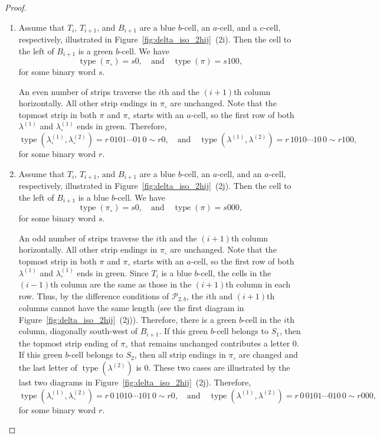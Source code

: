 \documentclass[11pt]{article}
\theoremstyle{definition}
\theoremstyle{remark}
\theoremstyle{definition}
\numberwithin{equation}{section}
\newcommand{\type}{\operatorname{type}}
\newcommand\qand{\quad\text{and}\quad}
\begin{document}
\begin{proof}
\begin{enumerate}[label=(2\alph*)]
\item Assume that \( T_i \), \( T_{i+1} \), and \( B_{i+1} \) are a
  blue \( b \)-cell, an \( a \)-cell, and a \( c \)-cell,
  respectively, illustrated in
  Figure~\ref{fig:delta_iso_2hij}~(2i). Then the cell to the left
  of \( B_{i+1} \) is a green \(b\)-cell. We have
  \[
    \type(\pi_\circ)=s0, \qand \type(\pi)=s100,
  \]
  for some binary word \(s\).

  An even number of strips traverse the \(i\)th and the \((i+1)\)th
  column horizontally. All other strip endings in \(\pi_\circ\) are
  unchanged. Note that the topmost strip in both \(\pi\) and
  \(\pi_\circ\) starts with an \(a\)-cell, so the first row of both
  \(\lambda^{(1)}\) and \(\lambda_\circ^{(1)}\) ends in green. Therefore,
  \[
    \type(\lambda_\circ^{(1)},\lambda_\circ^{(2)})=r\,0101\cdots01\,0\sim r0, \qand \type(\lambda^{(1)},\lambda^{(2)})=r\,1010\cdots10\,0\sim r100,
  \]
  for some binary word \(r\).


  \item Assume that \( T_i \), \( T_{i+1} \), and \( B_{i+1} \) are a
blue \( b \)-cell, an \( a \)-cell, and an \( a \)-cell, respectively,
  illustrated in Figure~\ref{fig:delta_iso_2hij}~(2j). Then the cell to the
  left of \( B_{i+1} \) is a blue \( b \)-cell. We have
  \[
    \type(\pi_\circ)=s0, \qand \type(\pi)=s000,
  \]
  for some binary word \(s\).

  An odd number of strips traverse the \(i\)th and the \((i+1)\)th
  column horizontally. All other strip endings in \(\pi_\circ\) are
  unchanged. Note that the topmost strip in both \(\pi\) and
  \(\pi_\circ\) starts with an \(a\)-cell, so the first row of both
  \(\lambda^{(1)}\) and \(\lambda_\circ^{(1)}\) ends in green. Since
  \( T_i \) is a blue \(b\)-cell, the cells in the \((i-1)\)th column
  are the same as those in the \((i+1)\)th column in each row. Thus,
  by the difference conditions of \(\mathcal{P}_{2,b}\), the \(i\)th
  and \((i+1)\)th columns cannot have the same length (see the first
  diagram in Figure~\ref{fig:delta_iso_2hij}~(2j)). Therefore, there is a
  green \(b\)-cell in the \(i\)th column, diagonally south-west of
  \( B_{i+1} \). If this green \(b\)-cell belongs to \(S_1\), then the
  topmost strip ending of \(\pi_\circ\) that remains unchanged
  contributes a letter \(0\). If this green \(b\)-cell belongs to
  \(S_2\), then all strip endings in \(\pi_\circ\) are changed and the
  last letter of \(\type(\lambda^{(2)})\) is \(0\). These two cases
  are illustrated by the last two diagrams in
  Figure~\ref{fig:delta_iso_2hij}~(2j). Therefore,
  \[
    \type(\lambda_\circ^{(1)},\lambda_\circ^{(2)})=r\,0\,1010\cdots101\,0\sim
    r0, \qand \type(\lambda^{(1)},\lambda^{(2)})=r\,0\,0101\cdots010\,0\sim r000,
  \]
 for some binary word \(r\).
\begin{figure}[h]
    \centering


\end{figure}
\end{enumerate}
\end{proof}
\end{document}
